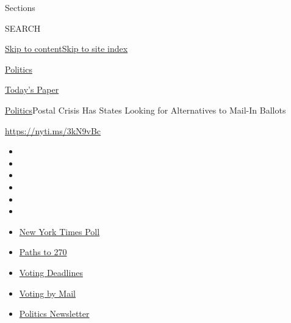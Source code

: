 Sections

SEARCH

\protect\hyperlink{site-content}{Skip to
content}\protect\hyperlink{site-index}{Skip to site index}

\href{https://www.nytimes3xbfgragh.onion/section/politics}{Politics}

\href{https://myaccount.nytimes3xbfgragh.onion/auth/login?response_type=cookie\&client_id=vi}{}

\href{https://www.nytimes3xbfgragh.onion/section/todayspaper}{Today's
Paper}

\href{/section/politics}{Politics}\textbar{}Postal Crisis Has States
Looking for Alternatives to Mail-In Ballots

\url{https://nyti.ms/3kN9vBc}

\begin{itemize}
\item
\item
\item
\item
\item
\item
\end{itemize}

\begin{itemize}
\item
  \href{https://www.nytimes3xbfgragh.onion/2020/09/12/us/politics/biden-trump-poll-wisconsin-minnesota.html?action=click\&pgtype=Article\&state=default\&region=TOP_BANNER\&context=storylines_menu}{New
  York Times Poll}
\item
  \href{https://www.nytimes3xbfgragh.onion/interactive/2020/us/elections/election-states-biden-trump.html?action=click\&pgtype=Article\&state=default\&region=TOP_BANNER\&context=storylines_menu}{Paths
  to 270}
\item
  \href{https://www.nytimes3xbfgragh.onion/interactive/2019/us/elections/2020-presidential-election-calendar.html?action=click\&pgtype=Article\&state=default\&region=TOP_BANNER\&context=storylines_menu}{Voting
  Deadlines}
\item
  \href{https://www.nytimes3xbfgragh.onion/interactive/2020/08/31/us/politics/vote-by-mail-deadlines.html?action=click\&pgtype=Article\&state=default\&region=TOP_BANNER\&context=storylines_menu}{Voting
  by Mail}
\item
  \href{https://www.nytimes3xbfgragh.onion/newsletters/politics?action=click\&pgtype=Article\&state=default\&region=TOP_BANNER\&context=storylines_menu}{Politics
  Newsletter}
\end{itemize}

